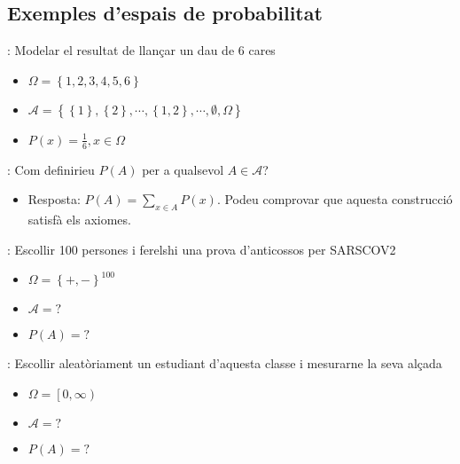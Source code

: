 \documentclass[letterpaper,10pt,english]{sphinxmanual}
\begin{document}
\subsection{Exemples d’espais de probabilitat}
\label{\detokenize{0_Intro/0_1_Repas_probabilitat:exemples-d-espais-de-probabilitat}}
: Modelar el resultat de llançar un dau de 6 cares
\begin{itemize}
\item {} 
\(\Omega = \left\{1, 2, 3, 4, 5, 6\right\}\)

\item {} 
\(\mathcal{A} = \left\{ \left\{1\right\}, \left\{2\right\}, \cdots, \left\{1, 2\right\}, \cdots, \emptyset, \Omega \right\}\)

\item {} 
\(P\left(x\right) = \frac{1}{6}, x \in \Omega\)

\end{itemize}

: Com definirieu \(P\left(A\right)\) per a qualsevol \(A \in \mathcal{A}\)?
\begin{itemize}
\item {} 
Resposta: \(P\left(A\right) = \sum_{x \in A} P\left(x\right)\). Podeu comprovar que aquesta construcció satisfà els axiomes.

\end{itemize}

: Escollir 100 persones i fer\sphinxhyphen{}els\sphinxhyphen{}hi una prova d’anticossos per SARS\sphinxhyphen{}COV\sphinxhyphen{}2
\begin{itemize}
\item {} 
\(\Omega = \left\{+, -\right\}^{100}\)

\item {} 
\(\mathcal{A} = ?\)

\item {} 
\(P\left(A\right) = ?\)

\end{itemize}

: Escollir aleatòriament un estudiant d’aquesta classe i mesurar\sphinxhyphen{}ne la seva alçada
\begin{itemize}
\item {} 
\(\Omega = \left[0, \infty \right)\)

\item {} 
\(\mathcal{A} = ?\)

\item {} 
\(P\left(A\right) = ?\)

\end{itemize}
\end{document}
